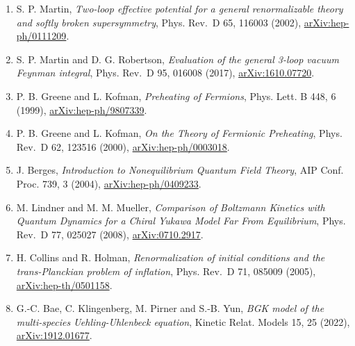 \documentclass[
  10pt,
]{article}
\providecommand{\tightlist}{%
  \setlength{\itemsep}{0pt}\setlength{\parskip}{0pt}}
\begin{document}
\begin{enumerate}
\def\labelenumi{\arabic{enumi}.}
\tightlist
\item
  S. P. Martin, \emph{Two-loop effective potential for a general
  renormalizable theory and softly broken supersymmetry}, Phys. Rev.~D
  65, 116003 (2002),
  \href{https://arxiv.org/abs/hep-ph/0111209}{arXiv:hep-ph/0111209}.
\item
  S. P. Martin and D. G. Robertson, \emph{Evaluation of the general
  3-loop vacuum Feynman integral}, Phys. Rev.~D 95, 016008 (2017),
  \href{https://arxiv.org/abs/1610.07720}{arXiv:1610.07720}.
\item
  P. B. Greene and L. Kofman, \emph{Preheating of Fermions}, Phys. Lett.
  B 448, 6 (1999),
  \href{https://arxiv.org/abs/hep-ph/9807339}{arXiv:hep-ph/9807339}.
\item
  P. B. Greene and L. Kofman, \emph{On the Theory of Fermionic
  Preheating}, Phys. Rev.~D 62, 123516 (2000),
  \href{https://arxiv.org/abs/hep-ph/0003018}{arXiv:hep-ph/0003018}.
\item
  J. Berges, \emph{Introduction to Nonequilibrium Quantum Field Theory},
  AIP Conf. Proc. 739, 3 (2004),
  \href{https://arxiv.org/abs/hep-ph/0409233}{arXiv:hep-ph/0409233}.
\item
  M. Lindner and M. M. Mueller, \emph{Comparison of Boltzmann Kinetics
  with Quantum Dynamics for a Chiral Yukawa Model Far From Equilibrium},
  Phys. Rev.~D 77, 025027 (2008),
  \href{https://arxiv.org/abs/0710.2917}{arXiv:0710.2917}.
\item
  H. Collins and R. Holman, \emph{Renormalization of initial conditions
  and the trans-Planckian problem of inflation}, Phys. Rev.~D 71, 085009
  (2005),
  \href{https://arxiv.org/abs/hep-th/0501158}{arXiv:hep-th/0501158}.
\item
  G.-C. Bae, C. Klingenberg, M. Pirner and S.-B. Yun, \emph{BGK model of
  the multi-species Uehling-Uhlenbeck equation}, Kinetic Relat. Models
  15, 25 (2022),
  \href{https://arxiv.org/abs/1912.01677}{arXiv:1912.01677}.
\end{enumerate}
\end{document}
